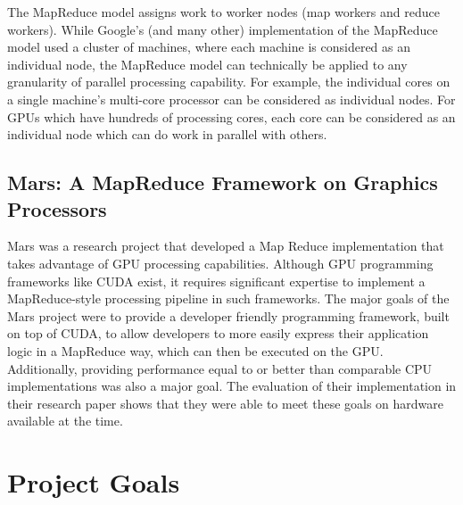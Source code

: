 \documentclass{article}
\begin{document}
The MapReduce model assigns work to worker nodes (map workers and reduce workers). While Google's (and many other) implementation of the MapReduce model used a cluster of machines, where each machine is considered as an individual node, the MapReduce model can technically be applied to any granularity of parallel processing capability. For example, the individual cores on a single machine's multi-core processor can be considered
as individual nodes. For GPUs which have hundreds of processing cores, each core can be considered as an individual node which can do work in parallel with others. 

\subsection{Mars: A MapReduce Framework on Graphics Processors}
Mars was a research project that developed a Map Reduce implementation that takes advantage of GPU processing capabilities. Although GPU programming frameworks like CUDA exist, it requires significant expertise to implement a MapReduce-style processing pipeline in such frameworks. The major goals of the Mars project were to provide a developer friendly programming framework, built on top of CUDA, to allow developers to more easily express their application logic in a MapReduce way, which can then be executed on the GPU. Additionally, providing performance equal to or better than comparable CPU implementations was also a major goal. The evaluation of their implementation in their research paper shows that they were able to meet these goals on hardware available at the time. 


\section{Project Goals}
\end{document}
